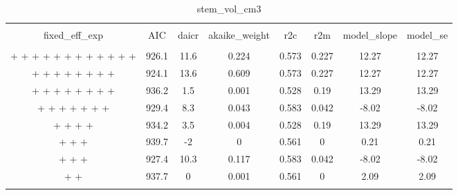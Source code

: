 
\begin{table}[!htbp] \centering 
  \caption{stem_vol_cm3} 
  \label{stem_vol_cm3} 
\begin{tabular}{@{\extracolsep{5pt}} cccccccc} 
\\[-1.8ex]\hline 
\hline \\[-1.8ex] 
fixed\_eff\_exp & AIC & daicr & akaike\_weight & r2c & r2m & model\_slope & model\_se \\ 
\hline \\[-1.8ex] 
 +  +  +  +  +  +  +  +  +  +  +  +  & 926.1 & 11.6 & 0.224 & 0.573 & 0.227 & 12.27 & 12.27 \\ 
 +  +  +  +  +  +  +  +  & 924.1 & 13.6 & 0.609 & 0.573 & 0.227 & 12.27 & 12.27 \\ 
 +  +  +  +  +  +  +  +  & 936.2 & 1.5 & 0.001 & 0.528 & 0.19 & 13.29 & 13.29 \\ 
 +  +  +  +  +  +  +  & 929.4 & 8.3 & 0.043 & 0.583 & 0.042 & -8.02 & -8.02 \\ 
 +  +  +  +  & 934.2 & 3.5 & 0.004 & 0.528 & 0.19 & 13.29 & 13.29 \\ 
 +  +  +  & 939.7 & -2 & 0 & 0.561 & 0 & 0.21 & 0.21 \\ 
 +  +  +  & 927.4 & 10.3 & 0.117 & 0.583 & 0.042 & -8.02 & -8.02 \\ 
 +  +  & 937.7 & 0 & 0.001 & 0.561 & 0 & 2.09 & 2.09 \\ 
\hline \\[-1.8ex] 
\end{tabular} 
\end{table} 
